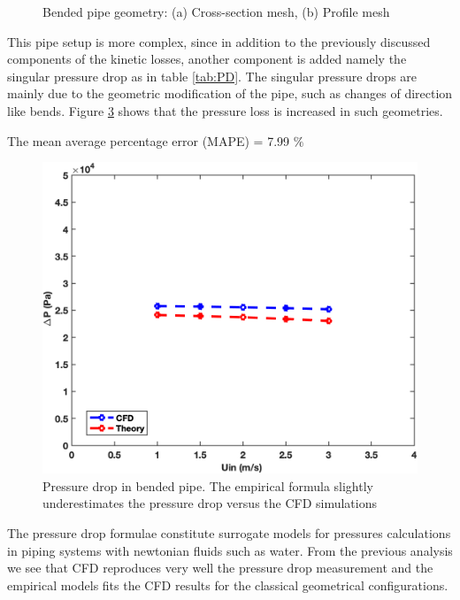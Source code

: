 \documentclass[11pt]{report}
\begin{document}
\begin{minipage}[t]{0.35\textwidth}
\begin{minipage}[t]{0.5\textwidth}
\begin{minipage}[t]{0.35\textwidth}
\begin{minipage}[t]{0.35\textwidth}
\begin{figure}[ht!]
 \label{fig:gauss}
 \end{figure}
%
 \begin{figure}[ht!]
 \centering
 \caption{Bended pipe geometry: (a) Cross-section mesh, (b) Profile mesh }
 \label{bend}
 \end{figure}
%
 This pipe setup is more complex, since in addition to the previously discussed components of the  kinetic losses, another component is added namely the singular pressure drop as in table \ref{tab:PD}. 
 The singular pressure drops are mainly due to the geometric modification of the pipe, such as changes of direction like bends. 
 Figure \ref{bend:theo} shows that the pressure loss is increased in such geometries.
 \begin{minipage}[t]{0.45\textwidth}
 \vspace{3.5cm}
 \small{The mean average percentage error (MAPE) = 7.99 $\%$}
%
\begin{figure}[ht!]
 \begin{center}
 \includegraphics[scale = 0.45]{figs/bend1}
 \caption{ Pressure drop in bended pipe. The empirical formula slightly underestimates the pressure drop versus the CFD simulations }
 \label{bend:theo}
 \end{center}
 \end{figure}
 \end{minipage}
The pressure drop formulae constitute surrogate models for pressures calculations in piping systems with newtonian fluids such as water. 
%
From the previous analysis we see that CFD reproduces very well the pressure drop measurement and the empirical models fits the CFD results for the classical geometrical configurations. 

\end{minipage}
\end{minipage}
\end{minipage}
\end{minipage}
\end{document}
